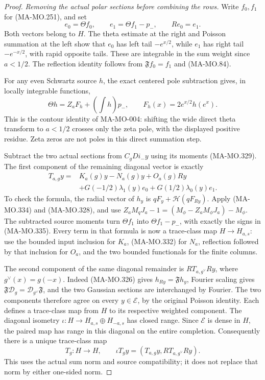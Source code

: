 \begin{proof}
\emph{Removing the actual polar sections before combining the rows.}
Write \(f_0,f_1\) for (MA-MO.251), and set
\[
       e_0=\Theta f_0,\qquad
       e_1=\Theta f_1-p_-,\qquad Re_0=e_1.
 \tag{MA-MO.333}
\]
Both vectors belong to \(H\). The theta estimate at the
right and Poisson summation at the left show that \(e_0\)
has left tail \(-e^{x/2}\), while \(e_1\) has right tail
\(-e^{-x/2}\), with rapid opposite tails. These are
integrable in the sum weight since \(a<1/2\). The reflection
identity follows from \(\mathfrak Ff_0=f_1\) and (MA-MO.84).

For any even Schwartz source \(h\), the exact centered
pole subtraction gives, in locally integrable functions,
\[
       \Theta h=Z_aF_h+\left(\int h\right)p_-,
                    \qquad F_h(x)=2e^{x/2}h(e^x).
 \tag{MA-MO.334}
\]
This is the contour identity of MA-MO-004: shifting the
wide direct theta transform to \(a<1/2\) crosses only
the zeta pole, with the displayed positive residue. Zeta
zeros are not poles in this direct summation step.

Subtract the two actual sections from \(C_gDi_-y\)
using its moments (MA-MO.329). The first component of the
remaining diagonal vector is exactly
\[
 \begin{aligned}
 T_{a,g}y={}&K_a(g)y-N_a(g)y+O_a(g)Ry\\
       &+G(-1/2)\lambda_1(y)e_0
         +G(1/2)\lambda_0(y)e_1.
 \end{aligned}
 \tag{MA-MO.335}
\]
To check the formula, the radial vector of \(h_y\) is
\(qF_y+\mathcal H(qF_{Ry})\). Apply (MA-MO.334) and
(MA-MO.328), and use
\(Z_aM_qJ_a-1=(M_\phi-Z_aM_\phi J_a)-M_\phi\).
The subtracted source moments turn \(\Theta f_1\) into
\(\Theta f_1-p_-\), with exactly the signs in
(MA-MO.335). Every term in that formula is now a
trace-class map \(H\to H_{a,s}\): use the bounded input
inclusion for \(K_a\), (MA-MO.332) for \(N_a\), reflection
followed by that inclusion for \(O_a\), and the two
bounded functionals for the finite columns.

The second component of the same diagonal remainder is
\(RT_{a,g^\vee}Ry\), where \(g^\vee(x)=g(-x)\).
Indeed (MA-MO.326) gives \(h_{Ry}=\mathfrak Fh_y\),
Fourier scaling gives
\(\mathfrak F\mathcal D_g=\mathcal D_{g^\vee}\mathfrak F\),
and the two Gaussian sections are interchanged by Fourier.
The two components therefore agree on every
\(y\in\mathcal E\), by the original Poisson identity.
Each defines a trace-class map from \(H\) to its respective
weighted component. The diagonal isometry
\(\iota:H\to H_{a,s}\oplus H_{-a,s}\) has closed range.
Since \(\mathcal E\) is dense in \(H\), the paired map
has range in this diagonal on the entire completion.
Consequently there is a unique trace-class map
\[
       T_g:H\to H,\qquad
       \iota T_g y=(T_{a,g}y,RT_{a,g^\vee}Ry).
 \tag{MA-MO.336}
\]
This uses the actual sum norm and source compatibility;
it does not replace that norm by either one-sided norm.


\end{proof}
